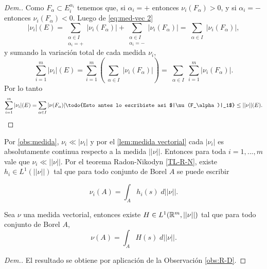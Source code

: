 \begin{proof}[Dem.]
  
  
 
 Como $F_{\alpha}\subset E_i^{\alpha_i}$ tenemos que, si $\alpha_i=+$ entonces $\nu_i(F_\alpha)>0$, y  si $\alpha_i=-$ entonces $\nu_i(F_\alpha)<0$. Luego de \eqref{eq:med-vec 2}
  \begin{equation*}
  	|\nu_i|(E)= \sum_{\substack{\alpha\in I\\ \alpha_i=+}}|\nu_i(F_\alpha)|+\sum_{\substack{\alpha\in I\\ \alpha_i=-}}|\nu_i(F_\alpha)|=\sum_{\substack{\alpha\in I}}|\nu_i(F_\alpha)|,
  \end{equation*}
  y sumando la variación total de cada medida $\nu_i$,
   \begin{equation*}
  	\sum_{i=1}^{m}|\nu_i|(E)=\sum_{i=1}^{m}\left( \sum_{\substack{\alpha\in I}}|\nu_i(F_\alpha)|\right) = \sum_{\substack{\alpha\in I}}\sum_{i=1}^{m}|\nu_i(F_\alpha)|.
  \end{equation*}
  Por lo tanto
  \begin{equation*}
  	\sum_{i=1}^{m}|\nu_i|(E)= \sum_{\substack{\alpha\in I}}|\nu(F_\alpha)|\textrm{\todo{Esto antes lo escribiste asi $|\nu(F_\alpha)|_1$}}\leq ||\nu||(E).
  \end{equation*}
  
\end{proof}
\begin{obs}

Por \eqref{obs:medida}, $\nu_i\ll |\nu_i|$ y por el  \ref{lem:medida vectorial} cada $|\nu_i|$ es absolutamente continua respecto a la medida $||\nu||$. Entonces para toda $i=1,..., m$ vale que $\nu_i\ll ||\nu||$.\label{obs:R-D}	Por el teorema Radon-Nikodyn \eqref{TL-R-N}, existe $h_i\in L^1(||\nu||) $ tal que para todo conjunto de Borel $A$ se puede escribir

	$$\nu_i(A)=\int_A h_i(s)\;d||\nu||.$$
 \end{obs}
 \begin{prop}\label{prop:medida vectorial}
Sea  $\nu$ una medida vectorial, entonces  existe $ H\in L^1(\mathbb{R}^m,||\nu||)$  tal que para todo conjunto de Borel $A$, 
    \begin{equation*}
		\nu(A)=\int_A H(s)\;d||\nu||.
	\end{equation*}
 \end{prop}

 \newpage
 
\begin{proof}[Dem.]
    El resultado se obtiene por aplicación de la Observación \eqref{obs:R-D}. 
\end{proof}     

